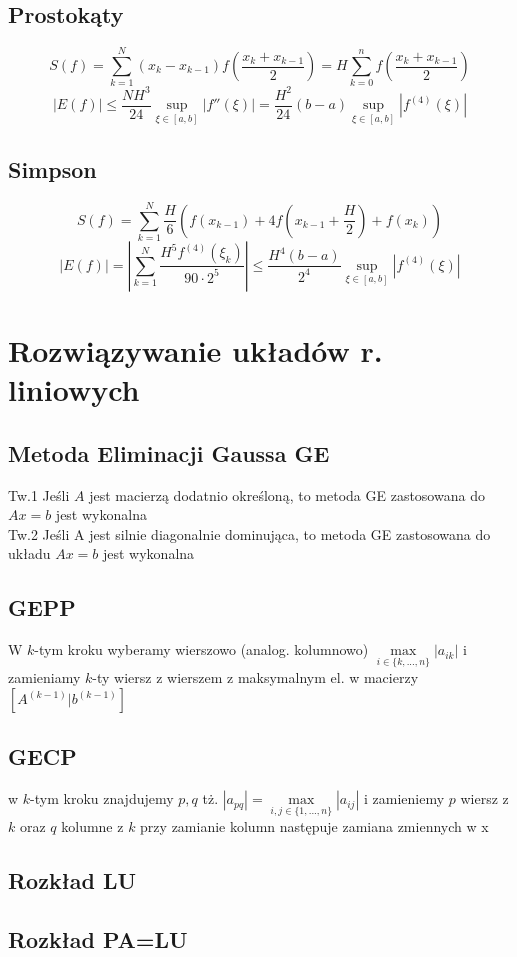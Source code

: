 \documentclass[10pt,twocolumn]{article}
\begin{document}
\begin{flushleft}
\subsection{Prostokąty}
$$S(f) = \sum_{k=1}^{N}(x_k-x_{k-1})f\left(\frac{x_k+x_{k-1}}{2}\right) = H\sum_{k=0}^{n}f(\frac{x_k + x_{k-1}}{2})$$
$$|E(f)| \leq \frac{NH^3}{24}\underset{\xi \in [a,b]}{\sup}|f''(\xi)| = \frac{H^2}{24}(b-a)\underset{\xi \in [a,b]}{\sup}|f^{(4)}(\xi)|$$
\subsection{Simpson}
$$S(f) = \sum_{k=1}^N \frac{H}{6} \left(f(x_{k-1})+4f\left(x_{k-1}+\frac{H}{2}\right)+f(x_k)\right)$$
$$|E(f)|= \left| \sum_{k=1}^N \frac{H^5f^{(4)}(\xi_k)}{90\cdot2^5}\right| \leq \frac{H^4(b-a)}{2^4}\underset{\xi \in [a,b]}{\sup}|f^{(4)}(\xi)| $$

\section{Rozwiązywanie układów r. liniowych}
\subsection{Metoda Eliminacji Gaussa GE}
Tw.1 Jeśli $A$ jest macierzą dodatnio określoną, to metoda GE zastosowana do $Ax=b$ jest wykonalna\\
Tw.2 Jeśli A jest silnie diagonalnie dominująca, to metoda GE zastosowana do układu $Ax=b$ jest wykonalna
\subsection{GEPP}
W $k$-tym kroku wyberamy wierszowo (analog. kolumnowo) $\underset{i \in \{k,...,n\}}{\max}|a_{ik}|$ i zamieniamy $k$-ty wiersz z wierszem z maksymalnym el. w macierzy $[A^{(k-1)}|b^{(k-1)}]$
\subsection{GECP}
w $k$-tym kroku znajdujemy $p,q$ tż. $|a_{pq}| = \underset{i,j \in \{1,...,n\}}{\max}|a_{ij}|$ i zamieniemy $p$ wiersz z $k$ oraz $q$ kolumne z $k$ przy zamianie kolumn następuje zamiana zmiennych w x
\subsection{Rozkład LU} %
\subsection{Rozkład PA=LU} 

\end{flushleft}
\end{document}
